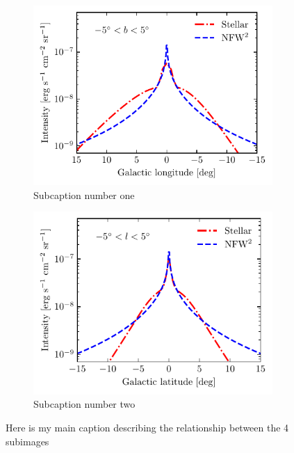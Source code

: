 \documentclass[doublespace,nopageskip]{VTthesis} %
\begin{document}
\begin{figure}[htb]
	\centering
	\begin{subfigure}[h]{0.45\textwidth}
		\centering
		\includegraphics[scale=0.90]{Figures/IC_MSPs/injection_lon.pdf}
		\caption{Subcaption number one}
		\label{sfig:first_subfig}
	\end{subfigure}
	\begin{subfigure}[h]{0.45\textwidth}
		\centering
		\includegraphics[scale=0.90]{Figures/IC_MSPs/injection_lat.pdf}
		\caption{Subcaption number two}
		\label{sfig:second_subfig}
	\end{subfigure}
	\caption{Here is my main caption describing the relationship between the 4 subimages}
	\label{fig:main_figure}
\end{figure}
\end{document}
